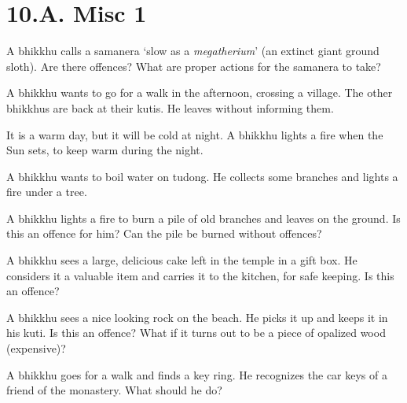 \chapter{10.A. Misc 1}
\renewcommand*{\theChapterTitle}{10.A. Misc 1}

A bhikkhu calls a samanera `slow as a \emph{megatherium}' (an extinct giant ground sloth).
Are there offences?
What are proper actions for the samanera to take?

\bigskip

A bhikkhu wants to go for a walk in the afternoon, crossing a village. The other bhikkhus are back at their kutis.
He leaves without informing them.

\bigskip

It is a warm day, but it will be cold at night. A bhikkhu lights a fire when the Sun sets, to keep warm during the night.

\bigskip

A bhikkhu wants to boil water on tudong. He collects some branches and lights a fire under a tree.

\bigskip

A bhikkhu lights a fire to burn a pile of old branches and leaves on the ground.
Is this an offence for him?
Can the pile be burned without offences?

\bigskip

A bhikkhu sees a large, delicious cake left in the temple in a gift box.
He considers it a valuable item and carries it to the kitchen, for safe keeping.
Is this an offence?

\bigskip

A bhikkhu sees a nice looking rock on the beach.
He picks it up and keeps it in his kuti.
Is this an offence?
What if it turns out to be a piece of opalized wood (expensive)?

\bigskip

A bhikkhu goes for a walk and finds a key ring.
He recognizes the car keys of a friend of the monastery.
What should he do?
